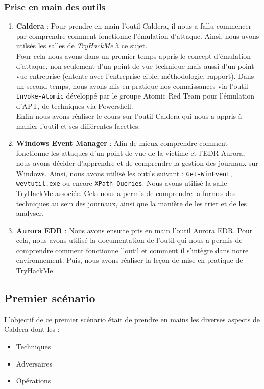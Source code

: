 \documentclass[12pt,letterpaper]{article}
\begin{document}
\subsubsection{Prise en main des outils}
\begin{enumerate}
    \item \textbf{Caldera} : 
    Pour prendre en main l'outil Caldera, il nous a fallu commencer par comprendre comment fonctionne l'émulation d'attaque.
    Ainsi, nous avons utilsés les salles de \textit{TryHackMe} à ce sujet. \\

    Pour cela nous avons dans un premier temps appris le concept d'émulation d'attaque, non seulement d'un point de vue technique mais aussi d'un point vue entreprise (entente avec l'entreprise cible, méthodologie, rapport).
    Dans un second temps, nous avons mis en pratique nos connaissances via l'outil \verb|Invoke-Atomic| développé par le groupe Atomic Red Team pour l'émulation d'APT, de techniques via Powershell. \\

    Enfin nous avons réaliser le cours sur l'outil Caldera qui nous a appris à manier l'outil et ses différentes facettes. 

    \item \textbf{Windows \- Event Manager} :
    Afin de mieux comprendre comment fonctionne les attaques d'un point de vue de la victime et l'EDR Aurora, nous avons décider d'apprendre et de comprendre la gestion des journaux sur Windows.
    Ainsi, nous avons utilisé les outils suivant : \verb|Get-WinEvent|, \verb|wevtutil.exe| ou encore \verb|XPath Queries|.
    Nous avons utilisé la salle TryHackMe associée.
    Cela nous a permis de comprendre la formes des techniques au sein des journaux, ainsi que la manière de les trier et de les analyser. \\
    
    \item \textbf{Aurora EDR} :
    Nous avons ensuite pris en main l'outil Aurora EDR.
    Pour cela, nous avons utilisé la documentation de l'outil qui nous a permis de comprendre comment fonctionne l'outil et comment il s'intègre dans notre environnement.
    Puis, nous avons réaliser la leçon de mise en pratique de TryHackMe. \\
\end{enumerate}

\newpage
\subsection{Premier scénario}
L'objectif de ce premier scénario était de prendre en mains les diverses aspects de Caldera dont les :
\begin{itemize}
    \item Techniques
    \item Adversaires
    \item Opérations
\end{itemize}
\end{document}
